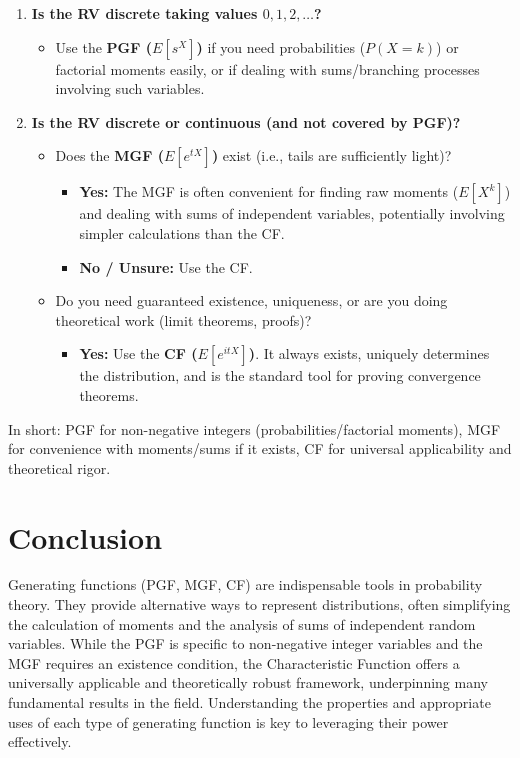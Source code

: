 \documentclass[11pt, letterpaper]{article}
\begin{document}
\begin{enumerate}
    \item \textbf{Is the RV discrete taking values $0, 1, 2, \dots$?}
        \begin{itemize}
            \item Use the \textbf{PGF ($E[s^X]$)} if you need probabilities ($P(X=k)$) or factorial moments easily, or if dealing with sums/branching processes involving such variables.
        \end{itemize}
    \item \textbf{Is the RV discrete or continuous (and not covered by PGF)?}
        \begin{itemize}
            \item Does the \textbf{MGF ($E[e^{tX}]$)} exist (i.e., tails are sufficiently light)?
                \begin{itemize}
                    \item \textbf{Yes:} The MGF is often convenient for finding raw moments ($E[X^k]$) and dealing with sums of independent variables, potentially involving simpler calculations than the CF.
                    \item \textbf{No / Unsure:} Use the CF.
                \end{itemize}
            \item Do you need guaranteed existence, uniqueness, or are you doing theoretical work (limit theorems, proofs)?
                \begin{itemize}
                    \item \textbf{Yes:} Use the \textbf{CF ($E[e^{itX}]$)}. It always exists, uniquely determines the distribution, and is the standard tool for proving convergence theorems.
                \end{itemize}
        \end{itemize}
\end{enumerate}

In short: PGF for non-negative integers (probabilities/factorial moments), MGF for convenience with moments/sums if it exists, CF for universal applicability and theoretical rigor.

\section{Conclusion}

Generating functions (PGF, MGF, CF) are indispensable tools in probability theory. They provide alternative ways to represent distributions, often simplifying the calculation of moments and the analysis of sums of independent random variables. While the PGF is specific to non-negative integer variables and the MGF requires an existence condition, the Characteristic Function offers a universally applicable and theoretically robust framework, underpinning many fundamental results in the field. Understanding the properties and appropriate uses of each type of generating function is key to leveraging their power effectively.
\end{document}
